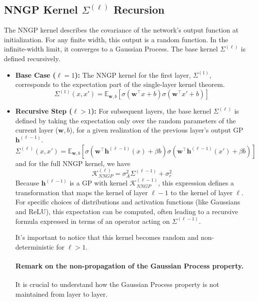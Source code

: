 \documentclass[a4paper]{article}
\begin{document}
\subsection{NNGP Kernel \(\Sigma^{(\ell)}\) Recursion}
The NNGP kernel describes the covariance of the network's output function at initialization. For any finite width, this output is a random function. In the infinite-width limit, it converges to a Gaussian Process. The base kernel $\Sigma^{(\ell)}$ is defined recursively.
\begin{itemize}
    \item \textbf{Base Case (\(\ell=1\)):} The NNGP kernel for the first layer, $\Sigma^{(1)}$, corresponds to the expectation part of the single-layer kernel theorem.
    \begin{equation}
        \Sigma^{(1)}(x, x') = \mathbb{E}_{\bm{w},b}\left[\sigma(\bm{w}^\top x + b)\sigma(\bm{w}^\top x' + b)\right]
    \end{equation}
    \item \textbf{Recursive Step (\(\ell > 1\)):} For subsequent layers, the base kernel $\Sigma^{(\ell)}$ is defined by taking the expectation only over the random parameters of the current layer ($\bm{w}, b$), for a given realization of the previous layer's output GP $\bm{h}^{(\ell-1)}$.
    \begin{equation}
        \Sigma^{(\ell)}(x, x') = \mathbb{E}_{\bm{w}, b} \left[ \sigma\left(\bm{w}^\top \bm{h}^{(\ell-1)}(x) + \beta b\right) \sigma\left(\bm{w}^\top \bm{h}^{(\ell-1)}(x') + \beta b\right) \right] 
    \end{equation}
    and for the full NNGP kernel, we have
    \begin{equation}
        \boxed{
        \mathcal{K}_{NNGP}^{(\ell)}=\sigma_A^2\Sigma^{(\ell-1)}+\sigma_c^2
        }
    \end{equation}
    Because $\bm{h}^{(\ell-1)}$ is a GP with kernel $\mathcal{K}_{NNGP}^{(\ell-1)}$, this expression defines a transformation that maps the kernel of layer $\ell-1$ to the kernel of layer $\ell$. For specific choices of distributions and activation functions (like Gaussians and ReLU), this expectation can be computed, often leading to a recursive formula expressed in terms of an operator acting on $\Sigma^{(\ell-1)}$.

    It's important to notice that this kernel becomes random and non-deterministic for $\ell >1$.

    \paragraph{Remark on the non-propagation of the Gaussian Process property.}
    It is crucial to understand how the Gaussian Process property is not maintained from layer to layer. 
    

\end{itemize}
\end{document}
